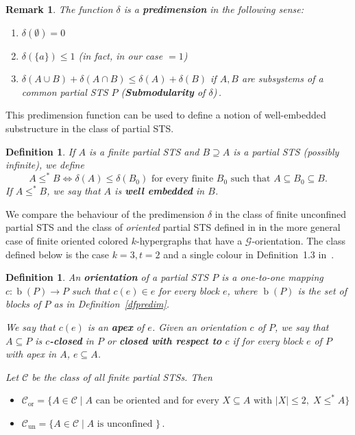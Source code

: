 \documentclass[a4paper, 11pt]{article}
\DeclareMathOperator{\bl}{b}
\newcommand{\Cor}{\mathcal{C}_\mathrm{or}}
\newcommand{\Cun}{\mathcal{C}_\mathrm{un}}
\theoremstyle{note}
\newtheorem{df}[thm]{Definition}
\newtheorem{rmk}[thm]{Remark}
\begin{document}
\begin{rmk} The function $\delta$ is a {\bf predimension} in the following sense:
\begin{enumerate}
\item $\delta(\emptyset)=0$
\item $\delta(\{a\})\leq 1$  (in fact,  in our case $= 1$)
\item $\delta(A\cup B)+\delta(A\cap B)\leq  \delta(A)+\delta(B)$  if  $A,B$ are subsystems of a common partial STS $P$ ({\bf Submodularity} of $\delta$)\,.
\end{enumerate}
\end{rmk}

This predimension function can be used to define a notion of well-embedded substructure in the class of partial STS.

\begin{df} If $A$ is a finite partial STS and $B\supseteq A$ is a partial STS (possibly infinite), we define
$$A\leq^* B \Leftrightarrow  \delta(A)\leq \delta(B_0) \mbox{ for every finite }  B_0 \mbox{ such that } A\subseteq B_0\subseteq B.$$
If $A\leq^* B$, we say that $A$  is {\bf well embedded} in $B$. %
\end{df}

We compare the behaviour of the predimension $\delta$ in the class of finite unconfined partial STS and the class of \textit{oriented} partial STS  defined in \cite{evans} in the more general case of finite oriented colored $k$-hypergraphs that have a $\mathcal{G}$-orientation. The class defined below is the case $k=3, t=2$ and a single colour in Definition~1.3 in~\cite{evans}.

\begin{df} 
An {\bf orientation} of a partial STS $P$  is a one-to-one mapping $c:\bl(P)\rightarrow P$  such that  $c(e)\in e$ for every block $e$, where $\bl(P)$ is the set of blocks of $P$ as in Definition~\ref{dfpredim}. 

We say that $c(e)$ is an {\bf apex} of $e$. Given an orientation $c$ of $P$, we say that $A\subseteq P$ is {\bf $c$-closed} in $P$ or {\bf closed with respect to} $c$  if for every block $e$ of $P$ with apex in $A$, $e\subseteq A$.

Let  $\mathcal{C}$ be the class of all finite partial STSs. Then 
\begin{itemize}
\item $\Cor =\{A\in\mathcal{C}\mid A \mbox{ can be oriented and for every } X\subseteq A \mbox{ with } |X|\leq 2,\; X\leq^\ast A\} \, $
\item $ \Cun=\{A\in\mathcal{C}\mid A \mbox{ is unconfined }\} \,. $
\end{itemize}
\end{df}
\end{document}
